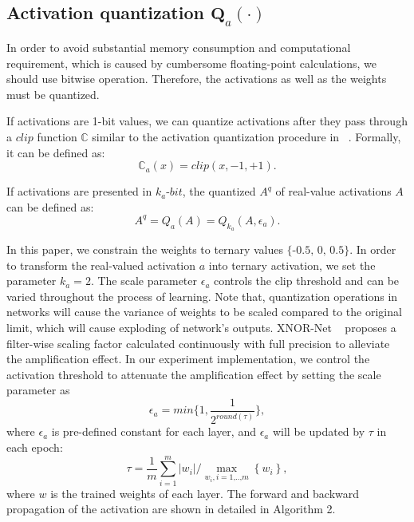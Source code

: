 \documentclass[twoside,twocolumn]{article}
\begin{document}
\subsection{Activation quantization $\boldsymbol{Q}_a\left( \cdot \right)$}
In order to avoid substantial memory consumption and computational requirement, which is caused by cumbersome floating-point calculations, we should use bitwise operation. Therefore, the activations as well as the weights must be quantized.

If activations are 1-bit values, we can quantize activations after they pass through a $clip$ function $\mathbb{C}$ similar to the activation quantization procedure in ~\cite{b37}. Formally, it can be defined as:
\begin{equation}
\mathbb{C}_a\left( x \right) =clip\left( x,-1,+1 \right).
\end{equation}

If activations are presented in $k_a$-$bit$, the quantized $A^q$ of real-value activations $A$ can be defined as:
\begin{equation}\label{eq:quantizaiton_activation}
A^q=Q_a\left( A \right) =Q_{k_a}\left( A,\epsilon _a \right).
\end{equation}

In this paper, we constrain the weights to ternary values $\text{\{-0.5,\ 0,\ 0.5\}}$. In order to transform the real-valued activation $a$ into ternary activation, we set the parameter $k_a=2$. The scale parameter $\epsilon_a$ controls the clip threshold and can be varied throughout the process of learning. Note that, quantization operations in networks will cause the variance of weights to be scaled compared to the original limit, which will cause exploding of network's outputs. XNOR-Net ~\cite{b17} proposes a filter-wise scaling factor calculated continuously with full precision to alleviate the amplification effect. In our experiment implementation, we control the activation threshold to attenuate the amplification effect by setting the scale parameter as
$$
\epsilon_a=min\{1,\frac{1}{2^{round(\tau)}}\},
$$
where $\epsilon_a$ is pre-defined constant for each layer, and $\epsilon_a$ will be updated by $\tau$ in each epoch:
$$
\tau =\frac{1}{m}\sum_{i=1}^m{\left| w_i \right|}/\underset{w_i,i=\text{1,..,}m}{\max}\left\{ w_i \right\},
$$
where $w$ is the trained weights of each layer. The forward and backward propagation of the activation are shown in detailed in Algorithm 2.
\end{document}
